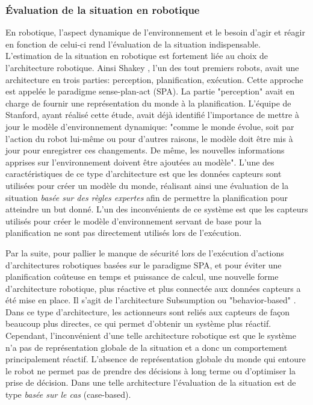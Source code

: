 \documentclass[a4paper,11pt,twoside]{StyleThese}
\begin{document}
\subsubsection{Évaluation de la situation en robotique}
En robotique, l'aspect dynamique de l'environnement et le besoin d'agir et réagir en fonction de celui-ci rend l'évaluation de la situation indispensable. L'estimation de la situation en robotique est fortement liée au choix de l'architecture robotique. Ainsi Shakey \cite{nilsson1969mobile}, l'un des tout premiers robots, avait une architecture en trois parties: perception, planification, exécution. Cette approche est appelée le paradigme sense-plan-act (SPA).
La partie "perception" avait en charge de fournir une représentation du monde à la planification.
L'équipe de Stanford, ayant réalisé cette étude, avait déjà identifié l'importance de mettre à jour le modèle d'environnement dynamique: "comme le monde évolue, soit par l'action du robot lui-même ou pour d'autres raisons, le modèle doit être mis à jour pour enregistrer ces changements. De même, les nouvelles informations apprises sur l'environnement doivent être ajoutées au modèle".
L'une des caractéristiques de ce type d'architecture est que les données capteurs sont utilisées pour créer un modèle du monde, réalisant ainsi une évaluation de la situation \textit{basée sur des règles expertes} afin de permettre la planification pour atteindre un but donné. L'un des inconvénients de ce système est que les capteurs utilisés pour créer le modèle d'environnement servant de base pour la planification ne sont pas directement utilisés lors de l'exécution.

Par la suite, pour pallier le manque de sécurité lors de l'exécution d'actions d'architectures robotiques basées sur le paradigme SPA, et pour éviter une planification coûteuse en temps et puissance de calcul,
une nouvelle forme d'architecture robotique, plus réactive et plus connectée aux données capteurs a été mise en place. Il s'agit de l'architecture Subsumption ou "behavior-based" \cite{brooks1986robust}. Dans ce type d'architecture, les actionneurs sont reliés aux capteurs de façon beaucoup plus directes, ce qui permet d'obtenir un système plus réactif. Cependant, l'inconvénient d'une telle architecture robotique est que le système n'a pas de représentation globale de la situation et a donc un comportement principalement réactif. L'absence de représentation globale du monde qui entoure le robot ne permet pas de prendre des décisions à long terme ou d'optimiser la prise de décision. Dans une telle architecture l'évaluation de la situation est de type \textit{basée sur le cas} (case-based).
\end{document}
